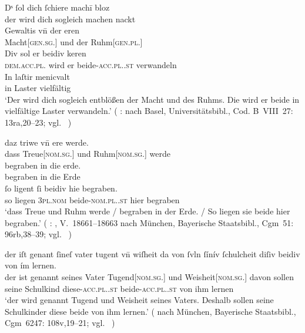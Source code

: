 \begin{exe}
\ex \label{ex:beid2p2combrem}
	\begin{xlist}
	\ex \label{ex:beid2p2combrem_1}
		\gll Dˢ ſol dich ſchiere machī bloz \\
			der wird dich sogleich machen nackt \\
	\sn \gll Gewaltis vn̄ der eren \\
			Macht[\textsc{gen.sg.\FemI}] und der Ruhm[\textsc{gen.pl.\FemI}] \\
	\sn \gll Div sol er beidiv keren \\
			\textsc{dem.acc.pl.\NeutI} wird er beide-\textsc{acc.pl.\NeutI.st}
			verwandeln \\
	\sn \gll In laſtir menicvalt \\
			in Laster vielfältig \\
		\trans `Der wird dich sogleich entblößen der Macht und des Ruhms.
			Die wird er beide in vielfältige Laster verwandeln.'
			(%
				: 
				nach Basel, Universitätsbibl., Cod. B~VIII~27: 13ra,20--23;
				vgl.~\cites[M317]{rem}%
			)

	\ex \label{ex:beid2p2combrem_2}
		\gll daz triwe vn̄ ere werde. \\
			dass Treue[\textsc{nom.sg.\FemI}] und Ruhm[\textsc{nom.sg.\FemI}] werde \\
	\sn \gll begraben in die erde. \\
			begraben in die Erde \\
	\sn \gll ſo ligent ſi beidiv hie begraben. \\
			so liegen \textsc{3pl\subI.nom} beide-\textsc{nom.pl.\NeutI.st} hier
			begraben \\
		\trans `dass Treue und Ruhm werde / begraben in der Erde. / So
			liegen sie beide hier begraben.'
			(%
				: ,
				V.~18661--18663 nach
				München, Bayerische Staatsbibl., Cgm~51: 96rb,38--39;
				vgl.~\cites[259]{maroldschroeder1969}[M342]{rem}%
			)

	\ex \label{ex:beid2p2combrem_3}
		\gll der iſt genant ſineſ vater tugent vn̄ wiſheit
			{da von} ſvln ſínív ſchulcheit\upshape\footnotemark{} diſiv
			beidiv von ím lernen. \\
			der ist genannt seines Vater Tugend[\textsc{nom.sg.\FemI}] und
			Weisheit[\textsc{nom.sg.\FemI}] davon sollen seine Schulkind
			diese-\textsc{acc.pl.\NeutI.st} beide-\textsc{acc.pl.\NeutI.st} von ihm
			lernen \\
		\trans `der wird genannt Tugend und Weisheit seines Vaters.
			Deshalb sollen seine Schulkinder diese beide von ihm lernen.'
			(%
				 nach
				München, Bayerische Staatsbibl., Cgm~6247: 108v,19--21;
				vgl.~\cite[M401]{rem}%
			)
	\end{xlist}
\end{exe}
